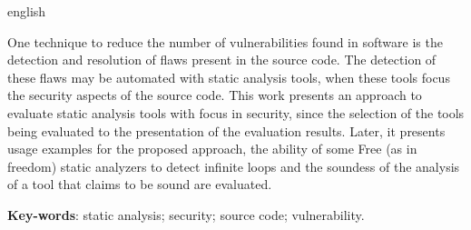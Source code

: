 \begin{resumo}[Abstract]
 \begin{otherlanguage*}{english}

   One technique to reduce the number of vulnerabilities found in software is
   the detection and resolution of flaws present in the source code.
   The detection of these flaws may be automated with static analysis tools,
   when these tools focus the security aspects of the source code. This work
   presents an approach to evaluate static analysis tools with focus in
   security, since the selection of the tools being evaluated to the
   presentation of the evaluation results. Later, it presents usage examples
   for the proposed approach, the ability of some Free (as in freedom) static
   analyzers to detect infinite loops and the soundess of the analysis of a tool
   that claims to be sound are evaluated. 

   \vspace{\onelineskip}
 
   \noindent 
   \textbf{Key-words}: static analysis; security; source code; vulnerability.
 \end{otherlanguage*}
\end{resumo}
